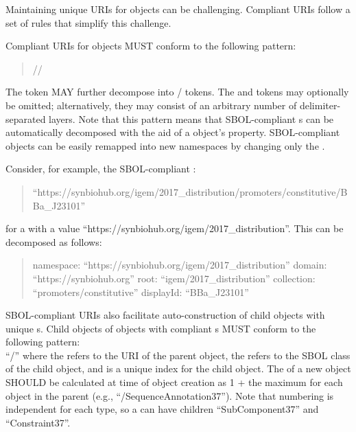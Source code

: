 Maintaining unique URIs for objects can be challenging.  Compliant URIs follow a set of rules that simplify this challenge.

Compliant URIs for  objects MUST conform to the following pattern:
\begin{quotation} 
//
\end{quotation}

The  token MAY further decompose into / tokens. The  and  tokens may optionally be omitted; alternatively, they may consist of an arbitrary number of delimiter-separated layers. Note that this pattern means that SBOL-compliant s can be automatically decomposed with the aid of a  object's  property. SBOL-compliant objects can be easily remapped into new namespaces by changing only the .

Consider, for example, the SBOL-compliant :
\begin{quote}``https://synbiohub.org/igem/2017\_distribution/promoters/constitutive/BBa\_J23101''\end{quote} 
for a  with a  value ``https://synbiohub.org/igem/2017\_distribution''.
This  can be decomposed as follows:
\begin{quote} 
namespace: ``https://synbiohub.org/igem/2017\_distribution'' \linebreak
domain: ``https://synbiohub.org'' \linebreak
root: ``igem/2017\_distribution'' \linebreak
collection: ``promoters/constitutive'' \linebreak
displayId: ``BBa\_J23101'' \linebreak
\end{quote}

SBOL-compliant URIs also facilitate auto-construction of child objects with unique s. 
Child objects of  objects with compliant s MUST conform to the following pattern:\\ ``/'' where the  refers to the URI of the parent object, the  refers to the SBOL class of the child object, and  is a unique index for the child object. 
The  of a new object SHOULD be calculated at time of object creation as 1 + the maximum  for each  object in the parent (e.g., ``/SequenceAnnotation37''). 
Note that numbering is independent for each type, so a  can have children ``SubComponent37'' and ``Constraint37''.

